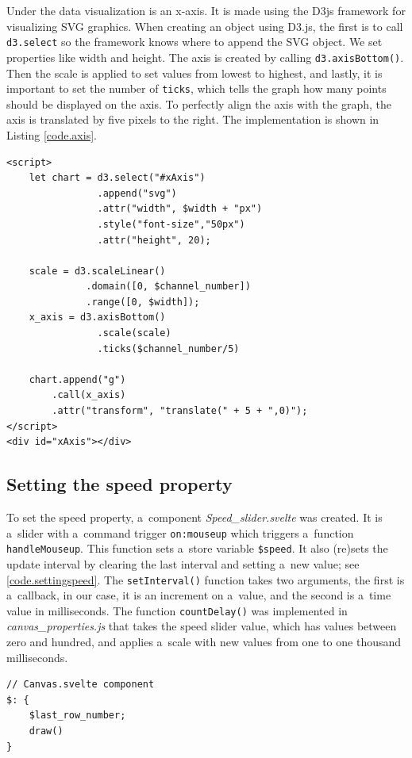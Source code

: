 Under the data visualization is an x-axis. It is made using the D3js framework for visualizing SVG graphics. When creating an object using D3.js, the first is to call \texttt{d3.select} so the framework knows where to append the SVG object. We set properties like width and height. The axis is created by calling \texttt{d3.axisBottom()}. Then the scale is applied to set values from lowest to highest, and lastly, it is important to set the number of \texttt{ticks}, which tells the graph how many points should be displayed on the axis. To perfectly align the axis with the graph, the axis is translated by five pixels to the right. The implementation is shown in Listing \ref{code.axis}.

\begin{lstlisting}[style=htmlcssjs,label=code.axis,caption={D3js x-axis implementation.}]    
<script> 
    let chart = d3.select("#xAxis")
                .append("svg")
                .attr("width", $width + "px")
                .style("font-size","50px")
                .attr("height", 20);

    scale = d3.scaleLinear()
              .domain([0, $channel_number])
              .range([0, $width]);
    x_axis = d3.axisBottom()
                .scale(scale)
                .ticks($channel_number/5)
                
    chart.append("g")
        .call(x_axis)
        .attr("transform", "translate(" + 5 + ",0)");
</script>
<div id="xAxis"></div>
\end{lstlisting}

\subsection{Setting the speed property}

To set the speed property, a~component \textit{Speed\_slider.svelte} was created. It is a~slider with a~command trigger \texttt{on:mouseup} which triggers a~function \texttt{handleMouseup}. This function sets a~store variable \texttt{\$speed}. It also (re)sets the update interval by clearing the last interval and setting a~new value; see \ref{code.settingspeed}. The  \texttt{setInterval()} function takes two arguments, the first is a~callback, in our case, it is an increment on a~value, and the second is a~time value in milliseconds. The function \texttt{countDelay()} was implemented in \textit{canvas\_properties.js} that takes the speed slider value, which has values between zero and hundred, and applies a~scale with new values from one to one thousand milliseconds.
\newpage
\begin{lstlisting}[caption={Svelte reactive statement for redrawing canvas element.},label=code.settingspeed]
// Canvas.svelte component
$: {
    $last_row_number;
    draw()
}
\end{lstlisting}

